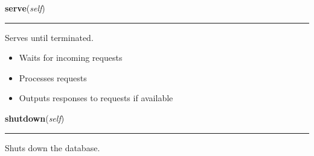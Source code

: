     \label{DBE:DBE:serve}

    \vspace{0.5ex}

\hspace{.8\funcindent}\begin{boxedminipage}{\funcwidth}

    \raggedright \textbf{serve}(\textit{self})

    \vspace{-1.5ex}

    \rule{\textwidth}{0.5\fboxrule}
\setlength{\parskip}{2ex}
    Serves until terminated.

    \begin{itemize}
    \setlength{\parskip}{0.6ex}
      \item Waits for incoming requests

      \item Processes requests

      \item Outputs responses to requests if available

    \end{itemize}

\setlength{\parskip}{1ex}
    \end{boxedminipage}

    \label{DBE:DBE:shutdown}

    \vspace{0.5ex}

\hspace{.8\funcindent}\begin{boxedminipage}{\funcwidth}

    \raggedright \textbf{shutdown}(\textit{self})

    \vspace{-1.5ex}

    \rule{\textwidth}{0.5\fboxrule}
\setlength{\parskip}{2ex}
    Shuts down the database.

\setlength{\parskip}{1ex}
    \end{boxedminipage}

    \label{DBE:DBE:set_measurements}

    \vspace{0.5ex}

